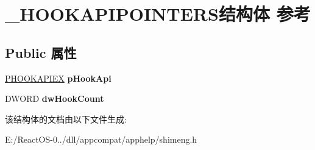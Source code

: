 \hypertarget{struct___h_o_o_k_a_p_i_p_o_i_n_t_e_r_s}{}\section{\+\_\+\+H\+O\+O\+K\+A\+P\+I\+P\+O\+I\+N\+T\+E\+R\+S结构体 参考}
\label{struct___h_o_o_k_a_p_i_p_o_i_n_t_e_r_s}
\subsection*{Public 属性}
\begin{DoxyCompactItemize}
\item 
\mbox{\label{struct___h_o_o_k_a_p_i_p_o_i_n_t_e_r_s_a9613694ee31ed025c13b68c5f8b5021e}} 
\hyperlink{structtag_h_o_o_k_a_p_i_e_x}{P\+H\+O\+O\+K\+A\+P\+I\+EX} {\bfseries p\+Hook\+Api}
\item 
\mbox{\label{struct___h_o_o_k_a_p_i_p_o_i_n_t_e_r_s_ae50c81f325e46c63ebf13d41896e6c13}} 
D\+W\+O\+RD {\bfseries dw\+Hook\+Count}
\end{DoxyCompactItemize}


该结构体的文档由以下文件生成\+:\begin{DoxyCompactItemize}
\item 
E\+:/\+React\+O\+S-\/0../dll/appcompat/apphelp/shimeng.\+h\end{DoxyCompactItemize}
